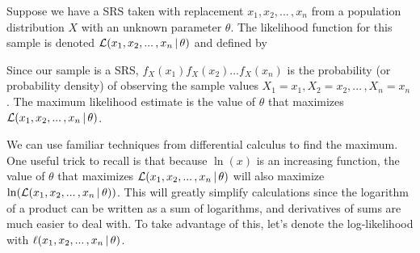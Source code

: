 \begin{defn}Suppose we have a SRS taken with replacement $x_1, x_2, ... \,,x_n$ from a population distribution $X$ with an unknown parameter $\theta$. The likelihood function for this sample is denoted $\mathcal{L}(x_1,x_2,...\,,x_n \,|\, \theta)$ and defined by
\end{defn}
\par
Since our sample is a SRS, $f_X(x_1)f_X(x_2)...f_X(x_n)$ is the probability (or probability density) of observing the sample values $X_1 = x_1, X_2  = x_2, ...\,, X_n = x_n$. The maximum likelihood estimate is the value of $\theta$ that maximizes $\mathcal{L}(x_1,x_2,...\,,x_n \,|\, \theta)$.
\par
We can use familiar techniques from differential calculus to find the maximum. One useful trick to recall is that because $\ln(x)$ is an increasing function, the value of $\theta$ that maximizes $\mathcal{L}(x_1,x_2,...\,,x_n \,|\, \theta)$ will also maximize $\ln(\mathcal{L}(x_1,x_2,...\,,x_n \,|\, \theta))$. This will greatly simplify calculations since the logarithm of a product can be written as a sum of logarithms, and derivatives of sums are much easier to deal with. To take advantage of this, let's denote the log-likelihood with $\ell(x_1,x_2,...\,,x_n \,|\, \theta)$.


